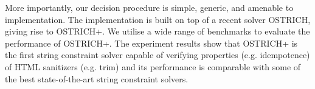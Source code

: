 More importantly, our decision procedure is simple, generic, and amenable to implementation. 
The implementation is built on top of a recent solver OSTRICH,
giving rise to OSTRICH+.
We utilise a wide range of benchmarks to evaluate the performance of OSTRICH+. The experiment results show that OSTRICH+ is the first string constraint solver capable of verifying properties (e.g. idempotence) of HTML sanitizers (e.g. trim) and its performance is comparable with some of the best state-of-the-art string constraint solvers.

